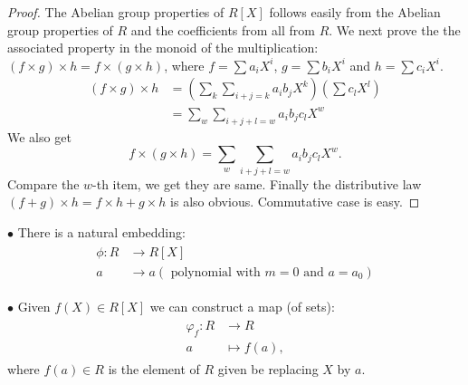\documentclass{article}
\begin{document}
\begin{proof}
The Abelian group properties of $R[X]$ follows easily from the Abelian group properties of $R$ and the coefficients from all from $R$. We next prove the the associated property in the monoid of the multiplication: $(f\times g)\times h = f\times (g\times h)$, where $f=\sum a_iX^i$, $g=\sum b_iX^i$ and $h=\sum c_iX^i$.
\begin{align*}
  (f\times g)\times h  &= (\sum_k\sum_{i+j=k}a_ib_jX^k)(\sum c_lX^l)\\ 
  &= \sum_w\sum_{i+j+l=w}a_ib_jc_lX^w
\end{align*}
We also get $$f\times (g\times h)= \sum_w\sum_{i+j+l=w}a_ib_jc_lX^w.$$ Compare the $w$-th item, we get they are same.
Finally the distributive law $(f+ g)\times h= f\times h + g\times h$ is also obvious. Commutative case is easy.
\end{proof}


$\bullet$ There is a natural embedding:
\begin{align*}
\begin{aligned}
\phi: R & \longrightarrow R[X] \\
a & \longrightarrow a\left(\text { polynomial with } m=0 \text { and } a=a_{0}\right)
\end{aligned}
\end{align*}

$\bullet$ Given $f(X) \in R[X]$ we can construct a map (of sets):
\begin{align*}
\begin{aligned}
\varphi_{f}: R & \longrightarrow R \\
a & \mapsto f(a),
\end{aligned}
\end{align*}
where $f(a) \in R$ is the element of $R$ given be replacing $X$ by $a$. 

\end{document}
